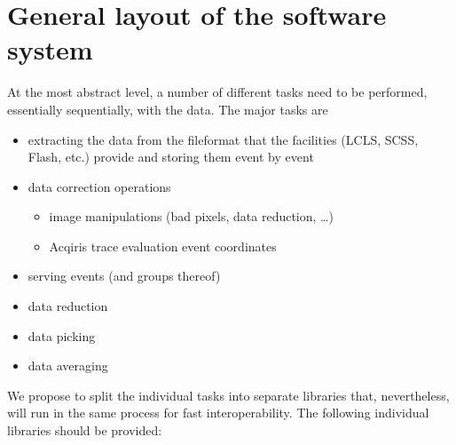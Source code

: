 \documentclass[11pt,a4paper,oneside]{article}
\begin{document}
\section{General layout of the software system}
\label{sec:general-layout}

At the most abstract level, a number of different tasks need to be performed, essentially sequentially, with the data. The major tasks are
\begin{itemize}
\item extracting the data from the fileformat that the facilities (LCLS, SCSS, Flash, etc.) provide and storing them event by event
\item data correction operations
   \begin{itemize}
   \item image manipulations (bad pixels, data reduction, \dots )
   \item Acqiris trace evaluation event coordinates
   \end{itemize}
\item serving events (and groups thereof)
\item data reduction
\item data picking
\item data averaging
\end{itemize}
We propose to split the individual tasks into separate libraries that, nevertheless, will run in the same process for fast interoperability. The following individual libraries should be provided:
\end{document}
